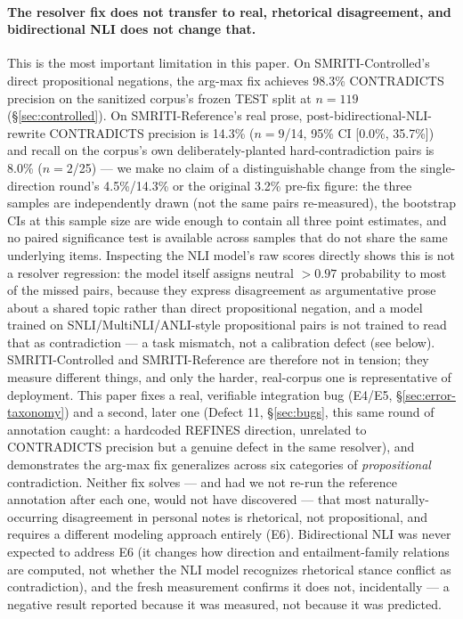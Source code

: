 \paragraph{The resolver fix does not transfer to real, rhetorical
disagreement, and bidirectional NLI does not change that.} This is the
most important limitation in this paper. On SMRITI-Controlled's direct
propositional negations, the arg-max fix achieves 98.3\% CONTRADICTS
precision on the sanitized corpus's frozen TEST split at $n=119$
(\S\ref{sec:controlled}). On SMRITI-Reference's real
prose, post-bidirectional-NLI-rewrite CONTRADICTS precision is 14.3\%
($n=9$/14, 95\% CI [0.0\%, 35.7\%]) and recall on the corpus's own
deliberately-planted hard-contradiction pairs is 8.0\% ($n=2$/25) ---
we make no claim of a distinguishable change from the single-direction
round's 4.5\%/14.3\% or the original 3.2\% pre-fix figure: the three
samples are independently drawn (not the same pairs re-measured), the
bootstrap CIs at this sample size are wide enough to contain all three
point estimates, and no paired significance test is available across
samples that do not share the same underlying items. Inspecting the NLI model's
raw scores directly shows this is not a resolver regression: the model
itself assigns neutral $>0.97$ probability to most of the missed pairs,
because they express disagreement as argumentative prose about a shared
topic rather than direct propositional negation, and a model trained on
SNLI/MultiNLI/ANLI-style propositional pairs is not trained to read that
as contradiction --- a task mismatch, not a calibration defect (see
below). SMRITI-Controlled and SMRITI-Reference are therefore not
in tension; they measure different things, and only the harder,
real-corpus one is representative of deployment. This paper fixes a
real, verifiable integration bug (E4/E5, \S\ref{sec:error-taxonomy}) and
a second, later one (Defect 11, \S\ref{sec:bugs}, this same round of
annotation caught: a hardcoded REFINES direction, unrelated to CONTRADICTS
precision but a genuine defect in the same resolver), and demonstrates
the arg-max fix generalizes across six categories of \emph{propositional}
contradiction. Neither fix solves --- and had we not re-run the reference
annotation after each one, would not have discovered --- that most
naturally-occurring disagreement in personal notes is rhetorical, not
propositional, and requires a different modeling approach entirely (E6).
Bidirectional NLI was never expected to address E6 (it changes how
direction and entailment-family relations are computed, not whether the
NLI model recognizes rhetorical stance conflict as contradiction), and
the fresh measurement confirms it does not, incidentally --- a negative
result reported because it was measured, not because it was predicted.

